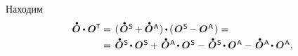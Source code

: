 \begin{otherlanguage}{russian}
\vspace{-1.32em} \noindent Находим
\vspace{.2em}\[\begin{array}{r@{\hspace{.25em}}c@{\hspace{.4em}}l}
\mathdotabove{\rotationtensor} \dotp \rotationtensor^{\T} & = & (\hspace{.1em} \mathdotabove{\rotationtensor}^{\mathsf{\hspace{.12ex}S}} \hspace{-0.16ex} + \mathdotabove{\rotationtensor}^{\mathsf{\hspace{.12ex}A}} \hspace{.05em}) \hspace{-0.1ex} \dotp \hspace{-0.1ex} (\hspace{.1em} \rotationtensor^{\mathsf{\hspace{.12ex}S}} \hspace{-0.16ex} - \rotationtensor^{\mathsf{\hspace{.12ex}A}} \hspace{.1ex} \hspace{.05em}) =
\\[0.25em]
& = & \mathdotabove{\rotationtensor}^{\mathsf{\hspace{.12ex}S}} \hspace{-0.2ex}\dotp \rotationtensor^{\mathsf{\hspace{.12ex}S}}
+ \hspace{.2ex} \mathdotabove{\rotationtensor}^{\mathsf{\hspace{.12ex}A}} \hspace{-0.2ex}\dotp \rotationtensor^{\mathsf{\hspace{.12ex}S}}
- \hspace{.2ex} \mathdotabove{\rotationtensor}^{\mathsf{\hspace{.12ex}S}} \hspace{-0.2ex}\dotp \rotationtensor^{\mathsf{\hspace{.12ex}A}}
- \hspace{.2ex} \mathdotabove{\rotationtensor}^{\mathsf{\hspace{.12ex}A}} \hspace{-0.2ex}\dotp \rotationtensor^{\mathsf{\hspace{.12ex}A}} ,
\end{array}\]


\end{otherlanguage}
